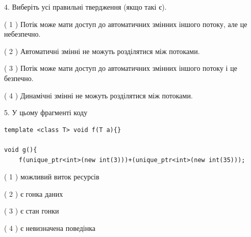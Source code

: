 \documentclass[12pt, ukrainian]{article}
\begin{document}
\begin {large}
{%
4. Виберіть усі правильні твердження (якщо такі є).\par
\vspace{2mm}

( 1 ) Потік може мати доступ до автоматичних змінних іншого потоку, але це небезпечно.%

( 2 ) Автоматичні змінні не можуть розділятися між потоками.%

( 3 ) Потік може мати доступ до автоматичних змінних іншого потоку і це безпечно.%

( 4 ) Динамічні змінні не можуть розділятися між потоками.%


5. У цьому фрагменті коду
\begin{verbatim}
template <class T> void f(T a){}

void g(){
    f(unique_ptr<int>(new int(3)))+(unique_ptr<int>(new int(35)));
\end{verbatim}

( 1 ) можливий виток ресурсів%

( 2 ) є гонка даних%

( 3 ) є стан гонки%

( 4 ) є невизначена поведінка%
}
\end {large}
\end{document}
